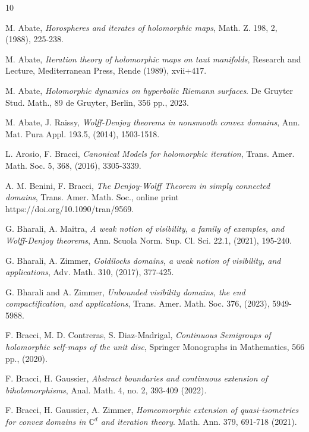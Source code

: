 \documentclass[12pt]{amsart}
\theoremstyle{definition}
\theoremstyle{remark}
\numberwithin{equation}{section}
\def\C{\mathbb C}
\begin{document}
\begin{thebibliography}{10}

  {\sc M. Abate}, {\it Horospheres and iterates of holomorphic maps}, Math. Z. 198, 2, (1988), 225-238.

  {\sc M. Abate}, {\it Iteration theory of holomorphic maps on taut manifolds},  Research and Lecture, Mediterranean Press, Rende (1989), xvii+417.

 {\sc M. Abate}, {\it Holomorphic dynamics on hyperbolic Riemann surfaces}. De Gruyter Stud. Math., 89 de Gruyter, Berlin, 356 pp., 2023. 

 {\sc M. Abate, J. Raissy}, {\it Wolff-Denjoy theorems in nonsmooth convex domains}, Ann. Mat. Pura Appl. 193.5, (2014), 1503-1518.

 {\sc L. Arosio, F. Bracci}, {\it Canonical Models for holomorphic iteration}, Trans. Amer. Math. Soc. 5, 368, (2016), 3305-3339.


 {\sc A. M. Benini, F. Bracci}, {\it The Denjoy-Wolff Theorem in simply connected domains}, Trans. Amer. Math. Soc., online print https://doi.org/10.1090/tran/9569.

  {\sc G. Bharali, A. Maitra}, {\it A weak notion of visibility, a family of examples, and Wolff-Denjoy theorems}, Ann. Scuola Norm. Sup. Cl. Sci. 22.1, (2021), 195-240.


 {\sc G. Bharali, A. Zimmer}, {\it Goldilocks domains, a weak notion of visibility, and applications}, Adv. Math. 310, (2017), 377-425.

 {\sc G. Bharali and A. Zimmer}, {\it Unbounded visibility domains, the end compactification, and applications}, Trans. Amer. Math. Soc. 376, (2023), 5949-5988.

 {\sc F. Bracci, M. D. Contreras, S. Diaz-Madrigal}, {\it Continuous Semigroups of holomorphic self-maps of the unit disc}, Springer Monographs in Mathematics, 566 pp., (2020).

 {\sc F. Bracci, H. Gaussier}, {\it Abstract boundaries and continuous extension of biholomorphisms}, Anal. Math. 4, no. 2, 393-409 (2022).

 {\sc F. Bracci, H. Gaussier, A. Zimmer}, {\it Homeomorphic extension of quasi-isometries for convex domains in $\C^d$ and iteration theory}. Math. Ann. 379, 691-718 (2021).


\end{thebibliography}
\end{document}
